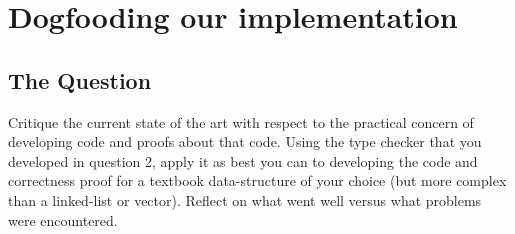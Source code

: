 \documentclass{article}
\begin{document}
\section{Dogfooding our implementation}

\subsection{The Question}
Critique the current state of the art with respect to the practical concern of
developing code and proofs about that code. Using the type checker that you
developed in question 2, apply it as best you can to developing the code and
correctness proof for a textbook data-structure of your choice (but more complex
than a linked-list or vector). Reflect on what went well versus what problems
were encountered.

 
\end{document}
